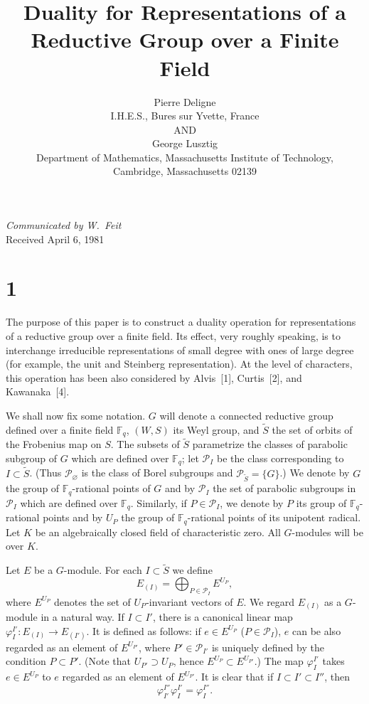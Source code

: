 \documentclass[12pt,a4paper]{article}
\title{Duality for Representations of a Reductive Group over a Finite Field}
\author{Pierre Deligne \\ I.H.E.S., Bures sur Yvette, France \\ AND \\ George Lusztig \\ Department of Mathematics, Massachusetts Institute of Technology, \\ Cambridge, Massachusetts 02139}
\date{}
\theoremstyle{plain}
\theoremstyle{definition}
\theoremstyle{remark}
\newcommand{\F}{\mathbb{F}}
\newcommand{\cP}{\mathcal{P}}
\providecommand{\cP}{\mathcal{P}}
\begin{document}

\maketitle

\begin{center}
\textit{Communicated by W.~Feit}\\[4pt]
Received April 6, 1981
\end{center}

\section*{1}

The purpose of this paper is to construct a duality operation for representations of a reductive group over a finite field. Its effect, very roughly speaking, is to interchange irreducible representations of small degree with ones of large degree (for example, the unit and Steinberg representation). At the level of characters, this operation has been also considered by Alvis~[1], Curtis~[2], and Kawanaka~[4].

We shall now fix some notation. $G$ will denote a connected reductive group defined over a finite field $\F_q$, $(W,S)$ its Weyl group, and $\tilde{S}$ the set of orbits of the Frobenius map on $S$. The subsets of $\tilde{S}$ parametrize the classes of parabolic subgroup of $G$ which are defined over $\F_q$; let $\cP_I$ be the class corresponding to $I \subset \tilde{S}$. (Thus $\cP_\varnothing$ is the class of Borel subgroups and $\cP_{\tilde{S}} = \{G\}$.) We denote by $G$ the group of $\F_q$-rational points of $G$ and by $\cP_I$ the set of parabolic subgroups in $\cP_I$ which are defined over $\F_q$. Similarly, if $P \in \cP_I$, we denote by $P$ its group of $\F_q$-rational points and by $U_P$ the group of $\F_q$-rational points of its unipotent radical. Let $K$ be an algebraically closed field of characteristic zero. All $G$-modules will be over $K$.

Let $E$ be a $G$-module. For each $I \subset \tilde{S}$ we define
\begin{equation*}
E_{(I)} = \bigoplus_{P \in \cP_I} E^{U_P},
\end{equation*}
where $E^{U_P}$ denotes the set of $U_P$-invariant vectors of $E$. We regard $E_{(I)}$ as a $G$-module in a natural way. If $I \subset I'$, there is a canonical linear map $\varphi_I^{I'} \colon E_{(I)} \to E_{(I')}$. It is defined as follows: if $e \in E^{U_P}$ ($P \in \cP_I$), $e$ can be also regarded as an element of $E^{U_{P'}}$, where $P' \in \cP_{I'}$ is uniquely defined by the condition $P \subset P'$. (Note that $U_{P'} \supset U_P$, hence $E^{U_P} \subset E^{U_{P'}}$.)
The map $\varphi_I^{I'}$ takes $e \in E^{U_P}$ to $e$ regarded as an element of $E^{U_{P'}}$. It is clear that if $I \subset I' \subset I''$, then
\begin{equation}\label{eq:1.1}
\varphi_{I'}^{I''} \varphi_I^{I'} = \varphi_I^{I''}.
\end{equation}
\end{document}
